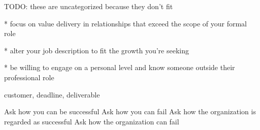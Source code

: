 TODO: these are uncategorized because they don't fit 


* focus on value delivery in relationships that exceed the scope of your formal role

* alter your job description to fit the growth you're seeking

* be willing to engage on a personal level and know someone outside their professional role


customer, deadline, deliverable

Ask how you can be successful
Ask how you can fail
Ask how the organization is regarded as successful
Ask how the organization can fail
